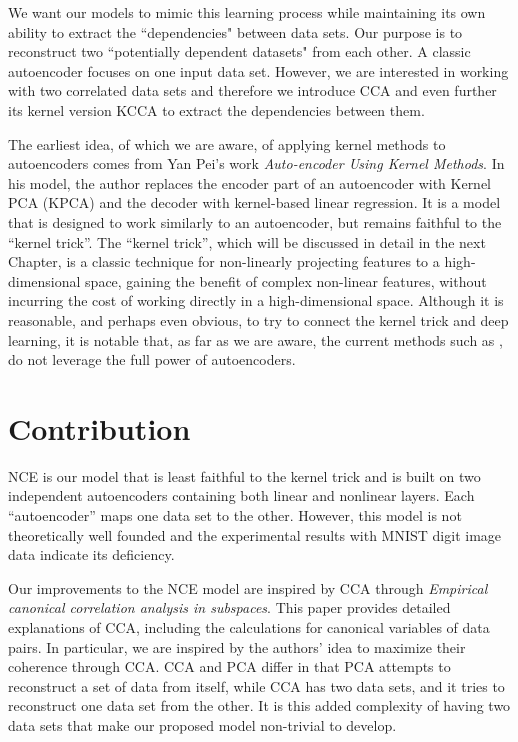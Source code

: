 \documentclass[12pt]{report} %
\begin{document}
We want our models to mimic this learning process while maintaining its own ability to extract the ``dependencies" between data sets. Our purpose is to reconstruct two ``potentially dependent datasets" from each other. A classic autoencoder focuses on one input data set. However, we are interested in working with two correlated data sets and therefore we introduce CCA and even further its kernel version KCCA to extract the dependencies between them. 

The earliest idea, of which we are aware, of applying kernel methods to autoencoders comes from Yan Pei's work \textit{Auto-encoder Using Kernel Methods}\cite{AUKM}. In his model, the author replaces the encoder part of an autoencoder with Kernel PCA (KPCA)\cite{KPCA} and the decoder with kernel-based linear regression. It is a model that is designed to work similarly to an autoencoder, but remains faithful to the ``kernel trick''. The ``kernel trick'', which will be discussed in detail in the next Chapter, is a classic technique for non-linearly projecting features to a high-dimensional space, gaining the benefit of complex non-linear features, without incurring the cost of working directly in a high-dimensional space. Although it is reasonable, and perhaps even obvious, to try to connect the kernel trick and deep learning, it is notable that, as far as we are aware, the current methods such as \cite{AUKM}, do not leverage the full power of autoencoders.

\section{Contribution}
NCE is our model that is least faithful to the kernel trick and is built on two independent autoencoders containing both linear and nonlinear layers. Each ``autoencoder'' maps one data set to the other. However, this model is not theoretically well founded and the experimental results with MNIST digit image data indicate its deficiency. 

Our improvements to the NCE model are inspired by CCA through \textit{Empirical canonical correlation analysis in subspaces}\cite{ECCA}. This paper provides detailed explanations of CCA, including the calculations for canonical variables of data pairs. In particular, we are inspired by the authors' idea to maximize their coherence through CCA. CCA and PCA differ in that PCA attempts to reconstruct a set of data from itself, while CCA has two data sets, and it tries to reconstruct one data set from the other. It is this added complexity of having two data sets that make our proposed model non-trivial to develop.
\end{document}
